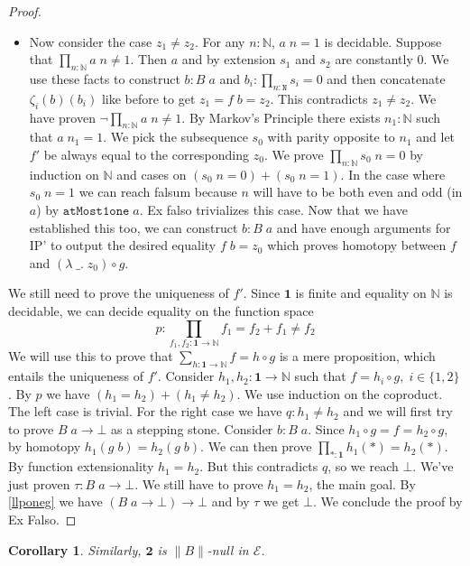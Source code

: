 \documentclass[12pt]{report}
\newtheorem{cor}[thm]{Corollary}
\theoremstyle{definition}
\begin{document}
\begin{proof}
\begin{itemize}
\item Now consider the case $z_1 \neq z_2$. 
For any $n : \mathbb{N}$, $a\; n = 1$ is decidable. 
Suppose that $\prod_{n : 
\mathbb{N}} a\; n \neq 1$. 
Then $a$ and by extension $s_1$ and $s_2$ are constantly $0$. 
We use these facts to construct $b : B\;a$ and $b_i : \prod_{n : \mathtt{N}}s_i = 0$ and then concatenate $\zeta_i(b)(b_i)$ like before to get $z_1 = f\; b = z_2$. 
This contradicts $z_1 \neq z_2$. 
We have proven $\neg \prod_{n : 
\mathbb{N}} a\; n \neq 1$. 
By Markov's Principle there exists $n_1 : \mathbb{N}$ such that $a\; n_1 = 1$. 
We pick the subsequence $s_0$ with parity opposite to $n_1$ and let $f'$ be always equal to the corresponding $z_0$. 
We prove $\prod_{n : \mathbb{N}} s_0\; n = 0$ by induction on $\mathbb{N}$ and cases on $(s_0 \;n = 0) + (s_0\;n = 1)$. 
In the case where $s_0\; n = 1$ we can reach falsum because $n$ will have to be both even and odd (in $a$) by $\mathtt{atMost1one} \; a$. Ex falso trivializes this case. 
Now that we have established this too, we can construct $b : B\; a$ and have enough arguments for IP' to output the desired equality $f\; b = z_0$ which proves homotopy between $f$ and $(\lambda\;\_.\; z_0) \circ g$.
\end{itemize}
We still need to prove the uniqueness of $f'$. 
Since $\mathbf{1}$ is finite and equality on $\mathbb{N}$ is decidable, we can decide equality on the function space 
$$p : \prod_{f_1,f_2 : \mathbf{1}\rightarrow \mathbb{N}} f_1 = f_2 + f_1 \neq f_2$$
We will use this to prove that $\sum_{h : \mathbf{1}\rightarrow \mathbb{N}} f= h \circ g$ is a mere proposition, which entails the uniqueness of $f'$. 
Consider $h_1,h_2 : \mathbf{1}\rightarrow \mathbb{N}$ such that $f= h_i \circ g,\; i \in \{1,2\}$. 
By $p$ we have $(h_1 = h_2) + (h_1 \neq h_2)$. 
We use induction on the coproduct. 
The left case is trivial. 
For the right case we have $q : h_1 \neq h_2$ and we will first try to prove $B\; a \rightarrow \bot$ as a stepping stone. 
Consider $b : B\; a$. 
Since $h_1 \circ g = f = h_2 \circ g$, by homotopy $h_1 (g\; b) = h_2 (g\; b)$. 
We can then prove $\prod_{*: \mathbf{1}} h_1 (*) = h_2 (*)$. 
By function extensionality $h_1 = h_2$. 
But this contradicts $q$, so we reach $\bot$. 
We've just proven $\tau : B\;a \rightarrow \bot$. 
We still have to prove $h_1 = h_2$, the main goal. 
By \ref{llponeg} we have $(B\; a \rightarrow \bot) \rightarrow \bot$ and by $\tau$ we get $\bot$. 
We conclude the proof by Ex Falso.
\end{proof}

\begin{cor}
Similarly, $\mathbf{2}$ is $\lVert B \rVert$-null in $\mathcal{E}$. 
\end{cor}
\end{document}
